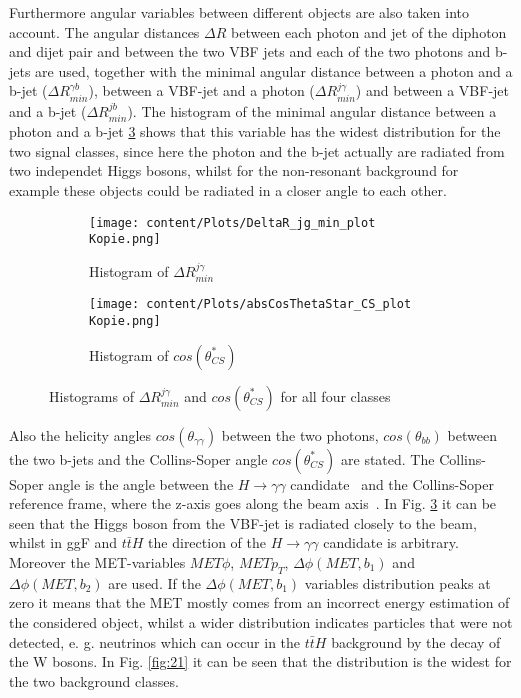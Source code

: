 Furthermore angular variables between different objects are also taken into account. The angular distances $\Delta R$ between each photon and jet of the diphoton and dijet pair 
and between the two VBF jets and each of the two photons and b-jets are used, together with the minimal angular distance between a photon and a b-jet ($\Delta R_{min}^{\gamma b}$), between a VBF-jet and a photon
($\Delta R_{min}^{j \gamma}$) and between a VBF-jet and a b-jet ($\Delta R_{min}^{j b}$). The histogram of the minimal angular distance between a photon and a b-jet \ref{fig:20} shows that this variable
has the widest distribution for the two signal classes, since here the photon and the b-jet actually are radiated from two independet Higgs bosons, whilst for the non-resonant background for example
these objects could be radiated in a closer angle to each other.

\begin{figure}[H]
    \centering
    \begin{subfigure}{0.45\textwidth}
        \centering
        \texttt{[image: content/Plots/DeltaR\_jg\_min\_plot Kopie.png]}
        \caption{Histogram of $\Delta R_{min}^{j \gamma}$}
        \label{fig:roc1}
    \end{subfigure}
    \hfill
    \begin{subfigure}{0.45\textwidth}
        \centering
        \texttt{[image: content/Plots/absCosThetaStar\_CS\_plot Kopie.png]}
        \caption{Histogram of $cos(\theta_{CS}^*)$}
        \label{fig:roc2}
    \end{subfigure}
    \caption{Histograms of $\Delta R_{min}^{j \gamma}$ and $cos(\theta_{CS}^*)$ for all four classes}
    \label{fig:20}
\end{figure}

Also the helicity angles $cos(\theta_{\gamma \gamma})$ between the two photons, $cos(\theta_{bb})$ between the two b-jets and the Collins-Soper angle $cos(\theta_{CS}^*)$ are stated.
The Collins-Soper angle is the angle between the $H \rightarrow \gamma \gamma$ candidate~\cite{Run2analysisnote} and the Collins-Soper reference frame, where the z-axis goes along the beam axis~\cite{CSangle}.
In Fig. \ref{fig:20} it can be seen that the Higgs boson from the VBF-jet is radiated closely to the beam, whilst in ggF and $t \bar{t} H$ the direction of the $H \rightarrow \gamma \gamma$ candidate is arbitrary.
Moreover the MET-variables $MET \phi$, $MET p_T$, $\Delta \phi (MET, b_1)$ and $\Delta \phi (MET, b_2)$ are used. If the $\Delta \phi (MET, b_1)$ variables distribution peaks at zero it means 
that the MET mostly comes from an incorrect energy estimation of the considered object, whilst a wider distribution indicates particles that were not detected, e. g. neutrinos which can occur
in the $t \bar{t} H$ background by the decay of the W bosons. In Fig. \ref{fig:21} it can be seen that the distribution is the widest for the two background classes.

